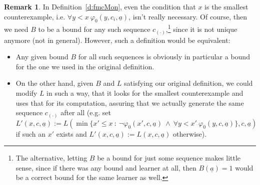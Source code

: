 \documentclass[1p]{elsarticle}
\newcommand{\tup}{\underline} %
\theoremstyle{plain}
\theoremstyle{definition}
\newtheorem{rmk}[thm]{Remark}
\theoremstyle{remark}
\renewcommand{\phi}{\varphi}
\theoremstyle{definition}
\begin{document}
\begin{rmk}\label{r:smallestCE}
In Definition~\ref{d:fmcMon}, even the condition that $x$ is the smallest counterexample, i.e. $\forall y<x\ \phi_0(y,c_i,\tup a)$, isn't really necessary. Of course, then we need $B$ to be a bound for any such sequence $c_{(\cdot)}$,\footnote{The alternative, letting $B$ be a bound for just some sequence makes little sense, since if there was any bound and learner at all, then $B(\tup a)=1$ would be a correct bound for the same learner as well.} since it is not unique anymore (not in general). However, such a definition would be equivalent:
\begin{itemize} 
\item Any given bound $B$ for all such sequences is obviously in particular a bound for the one we used in the original definition.
\item On the other hand, given $B$ and $L$ satisfying our original definition, we could modify $L$ in such a way, that it looks for the smallest counterexample and uses that for its computation, assuring that we actually generate the same sequence $c_{(\cdot)}$ after all (e.g. set 
$L'(x,c,\tup a):=L(\min \{x'\leq x\ :\  \neg\phi_0(x',c,\tup a)\ \wedge\ \forall y<x'\ \phi_0(y,c,\tup a)\},c,\tup a)$ if such an $x'$ exists and 
$L'(x,c,\tup a):=L(x,c,\tup a)$ otherwise).
\end{itemize}
\end{rmk}
\end{document}

